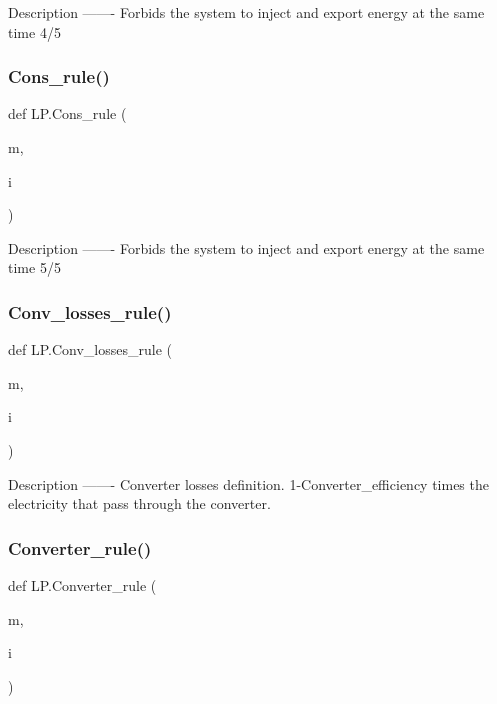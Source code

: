 \begin{DoxyVerb}Description
-------
Forbids the system to inject and export energy at the same time 4/5
\end{DoxyVerb}
 \mbox{\label{namespace_l_p_ab91a1eb4aff41e831d022f2ededb6dcd}} 
\subsubsection{\texorpdfstring{Cons\+\_\+rule()}{Cons\_rule()}}
{\footnotesize\ttfamily def L\+P.\+Cons\+\_\+rule (\begin{DoxyParamCaption}\item[{}]{m,  }\item[{}]{i }\end{DoxyParamCaption})}

\begin{DoxyVerb}Description
-------
Forbids the system to inject and export energy at the same time 5/5
\end{DoxyVerb}
 \mbox{\label{namespace_l_p_aae69104b239c580c31f61daa9845e39e}} 
\subsubsection{\texorpdfstring{Conv\+\_\+losses\+\_\+rule()}{Conv\_losses\_rule()}}
{\footnotesize\ttfamily def L\+P.\+Conv\+\_\+losses\+\_\+rule (\begin{DoxyParamCaption}\item[{}]{m,  }\item[{}]{i }\end{DoxyParamCaption})}

\begin{DoxyVerb}Description
-------
Converter losses definition. 1-Converter_efficiency times the electricity that pass through the converter.
\end{DoxyVerb}
 \mbox{\label{namespace_l_p_ab2b4ae6c314b779015922d5635090710}} 
\subsubsection{\texorpdfstring{Converter\+\_\+rule()}{Converter\_rule()}}
{\footnotesize\ttfamily def L\+P.\+Converter\+\_\+rule (\begin{DoxyParamCaption}\item[{}]{m,  }\item[{}]{i }\end{DoxyParamCaption})}

